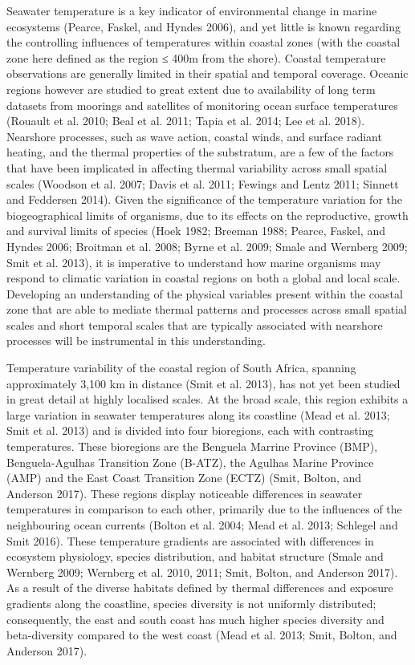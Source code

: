 \documentclass[10pt,a4paper,]{article}
\begin{document}
Seawater temperature is a key indicator of environmental change in
marine ecosystems (Pearce, Faskel, and Hyndes 2006), and yet little is
known regarding the controlling influences of temperatures within
coastal zones (with the coastal zone here defined as the region ≤ 400m
from the shore). Coastal temperature observations are generally limited
in their spatial and temporal coverage. Oceanic regions however are
studied to great extent due to availability of long term datasets from
moorings and satellites of monitoring ocean surface temperatures
(Rouault et al. 2010; Beal et al. 2011; Tapia et al. 2014; Lee et al.
2018). Nearshore processes, such as wave action, coastal winds, and
surface radiant heating, and the thermal properties of the substratum,
are a few of the factors that have been implicated in affecting thermal
variability across small spatial scales (Woodson et al. 2007; Davis et
al. 2011; Fewings and Lentz 2011; Sinnett and Feddersen 2014). Given the
significance of the temperature variation for the biogeographical limits
of organisms, due to its effects on the reproductive, growth and
survival limits of species (Hoek 1982; Breeman 1988; Pearce, Faskel, and
Hyndes 2006; Broitman et al. 2008; Byrne et al. 2009; Smale and Wernberg
2009; Smit et al. 2013), it is imperative to understand how marine
organisms may respond to climatic variation in coastal regions on both a
global and local scale. Developing an understanding of the physical
variables present within the coastal zone that are able to mediate
thermal patterns and processes across small spatial scales and short
temporal scales that are typically associated with nearshore processes
will be instrumental in this understanding.

Temperature variability of the coastal region of South Africa, spanning
approximately 3,100 km in distance (Smit et al. 2013), has not yet been
studied in great detail at highly localised scales. At the broad scale,
this region exhibits a large variation in seawater temperatures along
its coastline (Mead et al. 2013; Smit et al. 2013) and is divided into
four bioregions, each with contrasting temperatures. These bioregions
are the Benguela Marrine Province (BMP), Benguela-Agulhas Transition
Zone (B-ATZ), the Agulhas Marine Province (AMP) and the East Coast
Transition Zone (ECTZ) (Smit, Bolton, and Anderson 2017). These regions
display noticeable differences in seawater temperatures in comparison to
each other, primarily due to the influences of the neighbouring ocean
currents (Bolton et al. 2004; Mead et al. 2013; Schlegel and Smit 2016).
These temperature gradients are associated with differences in ecosystem
physiology, species distribution, and habitat structure (Smale and
Wernberg 2009; Wernberg et al. 2010, 2011; Smit, Bolton, and Anderson
2017). As a result of the diverse habitats defined by thermal
differences and exposure gradients along the coastline, species
diversity is not uniformly distributed; consequently, the east and south
coast has much higher species diversity and beta-diversity compared to
the west coast (Mead et al. 2013; Smit, Bolton, and Anderson 2017).
\end{document}
